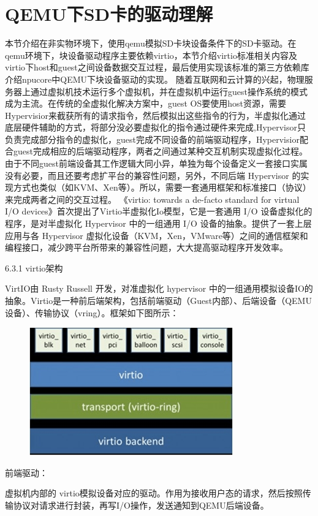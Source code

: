 \section{QEMU下SD卡的驱动理解}
本节介绍在非实物环境下，使用qemu模拟SD卡块设备条件下的SD卡驱动。在qemu环境下，块设备驱动程序主要依赖virtio，本节介绍virtio标准相关内容及virtio下host和guest之间设备数据交互过程，最后使用实现该标准的第三⽅依赖库介绍npucore中QEMU下块设备驱动的实现。
随着互联网和云计算的兴起，物理服务器上通过虚拟机技术运行多个虚拟机，并在虚拟机中运行guest操作系统的模式成为主流。在传统的全虚拟化解决方案中，guest OS要使用host资源，需要Hypervisior来截获所有的请求指令，然后模拟出这些指令的行为，半虚拟化通过底层硬件辅助的方式，将部分没必要虚拟化的指令通过硬件来完成,Hypervisor只负责完成部分指令的虚拟化，guest完成不同设备的前端驱动程序，Hypervisior配合guest完成相应的后端驱动程序，两者之间通过某种交互机制实现虚拟化过程。由于不同guest前端设备其工作逻辑大同小异，单独为每个设备定义一套接口实属没有必要，而且还要考虑扩平台的兼容性问题，另外，不同后端 Hypervisor 的实现方式也类似（如KVM、Xen等）。所以，需要⼀套通用框架和标准接口（协议）来完成两者之间的交互过程。
《virtio: towards a de-facto standard for virtual I/O devices》首次提出了Virtio半虚拟化Io模型，它是⼀套通用 I/O 设备虚拟化的程序，是对半虚拟化 Hypervisor 中的⼀组通用 I/O 设备的抽象。提供了⼀套上层应⽤与各 Hypervisor 虚拟化设备（KVM，Xen，VMware等）之间的通信框架和编程接口，减少跨平台所带来的兼容性问题，大大提高驱动程序开发效率。

6.3.1 virtio架构

VirtIO由 Rusty Russell 开发，对准虚拟化 hypervisor 中的一组通用模拟设备IO的抽象。Virtio是一种前后端架构，包括前端驱动（Guest内部）、后端设备（QEMU设备）、传输协议（vring）。框架如下图所示：

 
\begin{figure}[H]
    \centering
    \includegraphics{figures/06-03-1.png}
\end{figure}
前端驱动：

虚拟机内部的 virtio模拟设备对应的驱动。作用为接收用户态的请求，然后按照传输协议对请求进行封装，再写I/O操作，发送通知到QEMU后端设备。

